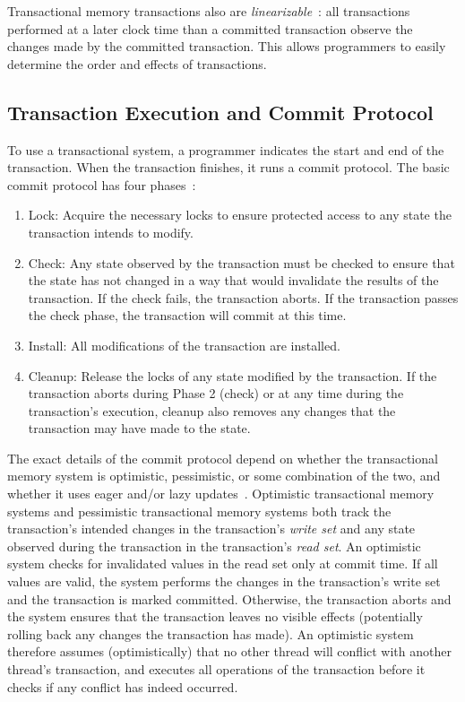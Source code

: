 Transactional memory transactions also are \emph{linearizable}~\cite{linearizability}: all transactions performed at a later clock time than a committed transaction observe the changes made by the committed transaction. This allows programmers to easily determine the order and effects of transactions.

\subsection{Transaction Execution and Commit Protocol}
To use a transactional system, a programmer indicates the start and end of the transaction. When the transaction finishes, it runs a commit protocol. The basic commit protocol has four phases~\cite{harristm}:
\begin{enumerate}
    \item Lock: Acquire the necessary locks to ensure protected access to any state the transaction intends to modify.
    \item Check: Any state observed by the transaction must be checked to ensure that the state has not changed in a way that would invalidate the results of the transaction. If the check fails, the transaction aborts. If the transaction passes the check phase, the transaction will commit at this time.
    \item Install: All modifications of the transaction are installed.
    \item Cleanup: Release the locks of any state modified by the transaction. If the transaction aborts during Phase 2 (check) or at any time during the transaction's execution, cleanup also removes any changes that the transaction may have made to the state.
\end{enumerate}

The exact details of the commit protocol depend on whether the transactional memory system is optimistic, pessimistic, or some combination of the two, and whether it uses eager and/or lazy updates~\cite{harristm}. 
Optimistic transactional memory systems and pessimistic transactional memory systems both track the transaction's intended changes in the transaction's \emph{write set} and any state observed during the transaction in the transaction's \emph{read set}. 
An optimistic system checks for invalidated values in the read set only at commit time. If all values are valid, the system performs the changes in the transaction's write set and the transaction is marked committed. Otherwise, the transaction aborts and the system ensures that the transaction leaves no visible effects (potentially rolling back any changes the transaction has made). An optimistic system therefore assumes (optimistically) that no other thread will conflict with another thread's transaction, and executes all operations of the transaction before it checks if any conflict has indeed occurred.

